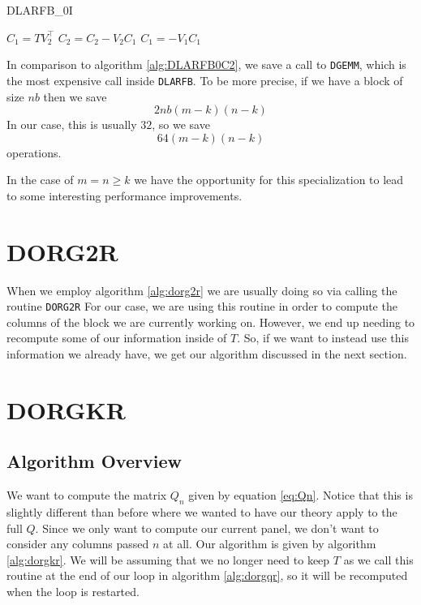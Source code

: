 \documentclass[12pt]{article}
\begin{document}
    \begin{algorithm}
        \caption{DLARFB\_0I}\label{alg:DLARFBInit}
        \begin{algorithmic}[1]
            \STATE $C_1 = TV_2^\top$
            \STATE $C_2 = C_2 - V_2C_1$
            \STATE $C_1 =     - V_1C_1$
        \end{algorithmic}
    \end{algorithm}
    
    In comparison to algorithm \ref{alg:DLARFB0C2}, we save a call to \verb|DGEMM|, which is the most expensive 
    call inside \verb|DLARFB|. To be more precise, if we have a block of size $nb$ then we save
    \[
        2nb\left(m-k\right)\left(n-k\right)
    \]
    In our case, this is usually $32$, so we save
    \[
        64\left(m-k\right)\left(n-k\right)
    \]
    operations. 

    In the case of $m=n\geq k$ we have the opportunity for this specialization to lead to some interesting
    performance improvements.
    \section{DORG2R}
    When we employ algorithm \ref{alg:dorg2r} we are usually doing so via calling the routine \verb|DORG2R|
    For our case, we are using this routine in order to compute the columns of the block we are currently 
    working on. However, we end up needing to recompute some of our information inside of $T$. So, if we want to
    instead use this information we already have, we get our algorithm discussed in the next section.
    \section{DORGKR}
    \subsection{Algorithm Overview}
    We want to compute the matrix $Q_n$ given by equation \ref{eq:Qn}. Notice that this is slightly different than
    before where we wanted to have our theory apply to the full $Q$. Since we only want to compute our current
    panel, we don't want to consider any columns passed $n$ at all. Our algorithm is given by 
    algorithm \ref{alg:dorgkr}. We will be assuming that we no longer need to keep $T$ as we call this routine
    at the end of our loop in algorithm \ref{alg:dorgqr}, so it will be recomputed when the loop is restarted.
\end{document}
